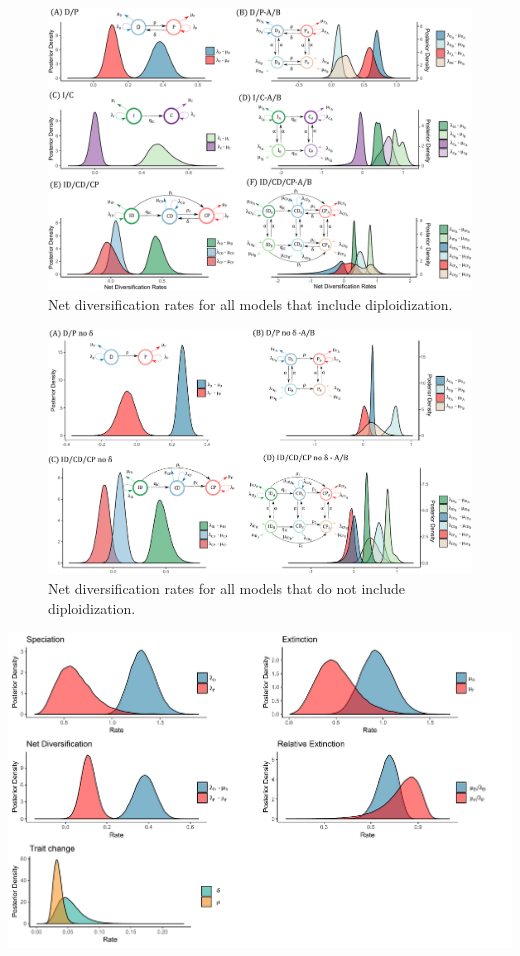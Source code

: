 \begin{figure}
\includegraphics[width=\textwidth]{Netdiversificationallmodels.pdf}
  \caption{Net diversification rates for all models that include diploidization.}  
\label{figure:netdivall}
\end{figure}

\begin{figure}
\includegraphics[width=\textwidth]{netdiversificationallnodip.pdf}
  \caption{Net diversification rates for all models that do not include diploidization.}  
\label{figure:netdivnodip}
\end{figure}

\begin{suppfigure}
\includegraphics[width=\textwidth]{bisseDPposteriordist.pdf}
\caption{Posterior distribution for each of the parameters in the D/P polyploidy model} %
\label{suppfigure:DP}
\end{suppfigure}

